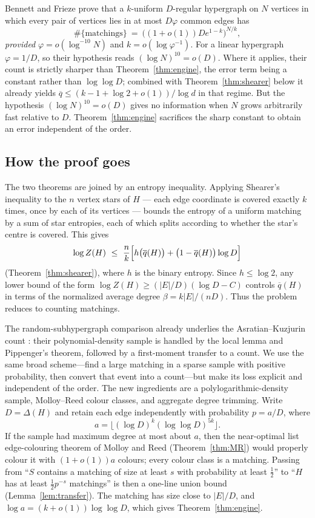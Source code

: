 \documentclass[10pt,a4paper]{amsart}
\newcommand{\EE}{E}
\newcommand{\qbar}{\overline{q}}
\newcommand{\Deltaop}{\Delta}
\begin{document}
Bennett and Frieze \cite[Theorem 4(b)]{BennettFrieze} prove that a $k$-uniform
$D$-regular hypergraph on $N$
vertices in which every pair of vertices lies in at most $D\varphi$ common edges has
\[
  \#\{\text{matchings}\}\ =\ \bigl((1+o(1))D e^{1-k}\bigr)^{N/k},
\]
\emph{provided} $\varphi=o(\log^{-10}N)$ and $k=o(\log \varphi^{-1})$. For a linear
hypergraph $\varphi=1/D$, so their hypothesis reads $(\log N)^{10}=o(D)$. Where it applies,
their count is strictly sharper than Theorem~\ref{thm:engine}, the error term being a
constant rather than $\log\log D$; combined with Theorem~\ref{thm:shearer} below it already
yields $\qbar\le(k-1+\log2+o(1))/\log d$ in that regime. But the hypothesis
$(\log N)^{10}=o(D)$ gives no information when $N$ grows arbitrarily fast relative to
$D$. Theorem~\ref{thm:engine} sacrifices the sharp constant to obtain an error independent
of the order.

\subsection{How the proof goes}
\label{subsec:overview}

The two theorems are joined by an entropy inequality. Applying Shearer's inequality to the
$n$ vertex stars of $H$ --- each edge coordinate is covered exactly $k$ times, once by each
of its vertices --- bounds the entropy of a uniform matching by a sum of star entropies,
each of which splits according to whether the star's centre is covered. This gives
\[
  \log Z(H)\ \le\ \frac nk\Bigl[h\bigl(\qbar(H)\bigr)
    +\bigl(1-\qbar(H)\bigr)\log D\Bigr]
\]
(Theorem~\ref{thm:shearer}), where $h$ is the binary entropy. Since $h\le\log2$, any lower
bound of the form $\log Z(H)\ge(|\EE|/D)(\log D-C)$ controls $\qbar(H)$ in terms of the
normalized average degree $\beta=k|\EE|/(nD)$. Thus the problem reduces to counting
matchings.

The random-subhypergraph comparison already underlies the Asratian--Kuzjurin count
\cite{AsratianKuzjurin}: their polynomial-density sample is handled by the local lemma
and Pippenger's theorem, followed by a first-moment transfer to a count. We use the same
broad scheme---find a large matching in a sparse sample with positive probability, then
convert that event into a count---but make its loss explicit and independent of the
order. The new ingredients are a polylogarithmic-density sample, Molloy--Reed colour
classes, and aggregate degree trimming. Write $D=\Deltaop(H)$ and retain each edge
independently with probability
$p=a/D$, where
\[
  a=\bigl\lfloor(\log D)^k(\log\log D)^{5k}\bigr\rfloor.
\]
If the sample had maximum degree at most about $a$,
then the near-optimal list edge-colouring theorem of Molloy and Reed
(Theorem~\ref{thm:MR}) would properly colour it with $(1+o(1))a$ colours; every colour
class is a matching. Passing from ``$S$ contains a matching of size at least $s$
with probability at least $\tfrac12$'' to ``$H$ has at least $\tfrac12 p^{-s}$ matchings''
is then a one-line union bound (Lemma~\ref{lem:transfer}). The matching has size close to
$|\EE|/D$, and $\log a=(k+o(1))\log\log D$, which gives Theorem~\ref{thm:engine}.
\end{document}
